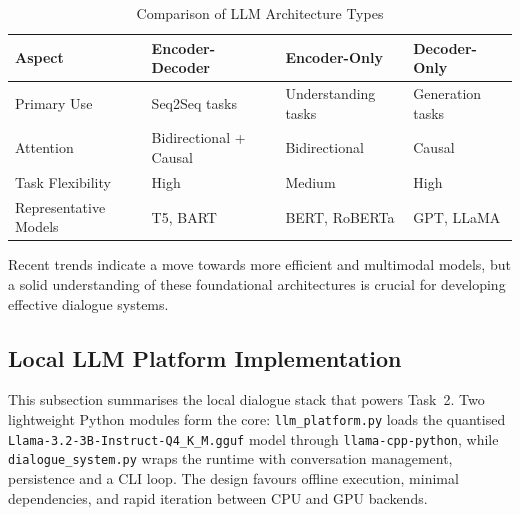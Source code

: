 \documentclass[12pt,a4paper]{article}
\begin{document}
\begin{table}[H]
\centering
\caption{Comparison of LLM Architecture Types}
\label{tab:llm_comparison}
\begin{tabular}{|l|l|l|l|}
\hline
\textbf{Aspect} & \textbf{Encoder-Decoder} & \textbf{Encoder-Only} & \textbf{Decoder-Only} \\
\hline
Primary Use & Seq2Seq tasks & Understanding tasks & Generation tasks \\
\hline
Attention & Bidirectional + Causal & Bidirectional & Causal \\
\hline
Task Flexibility & High & Medium & High \\
\hline
Representative Models & T5, BART & BERT, RoBERTa & GPT, LLaMA \\
\hline
\end{tabular}
\end{table}

Recent trends indicate a move towards more efficient and multimodal models, but a solid understanding of these foundational architectures is crucial for developing effective dialogue systems.





\subsection{Local LLM Platform Implementation}

This subsection summarises the local dialogue stack that powers Task~2. Two lightweight Python modules form the core: \texttt{llm\_platform.py} loads the quantised \texttt{Llama-3.2-3B-Instruct-Q4\_K\_M.gguf} model through \texttt{llama-cpp-python}, while \texttt{dialogue\_system.py} wraps the runtime with conversation management, persistence and a CLI loop. The design favours offline execution, minimal dependencies, and rapid iteration between CPU and GPU backends.
\end{document}

